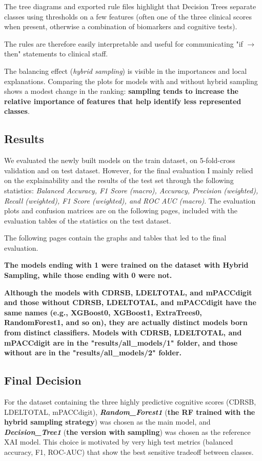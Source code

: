 The tree diagrams and exported rule files highlight that Decision Trees separate classes using thresholds on a few features (often one of the three clinical scores when present, otherwise a combination of biomarkers and cognitive tests). 

The rules are therefore easily interpretable and useful for communicating "if $\to$ then" statements to clinical staff.

\vspace{2mm}

The balancing effect (\textit{hybrid sampling}) is visible in the importances and local explanations.
Comparing the plots for models with and without hybrid sampling shows a modest change in the ranking: \textbf{sampling tends to increase the relative importance of features that help identify less represented classes}.

\subsection{Results}
We evaluated the newly built models on the train dataset, on 5-fold-cross validation and on test dataset. However, for the final evaluation I mainly relied on the explainability and the results of the test set through the following statistics: \textit{Balanced Accuracy, F1 Score (macro), Accuracy, Precision (weighted), Recall (weighted), F1 Score (weighted), and ROC AUC (macro)}. The evaluation plots and confusion matrices are on the following pages, included with the evaluation tables of the statistics on the test dataset. 

The following pages contain the graphs and tables that led to the final evaluation. 

\textbf{The models ending with 1 were trained on the dataset with Hybrid Sampling, while those ending with 0 were not.}

\textbf{Although the models with CDRSB, LDELTOTAL, and mPACCdigit and those without CDRSB, LDELTOTAL, and mPACCdigit have the same names (e.g., XGBoost0, XGBoost1, ExtraTrees0, RandomForest1, and so on), they are actually distinct models born from distinct classifiers. Models with CDRSB, LDELTOTAL, and mPACCdigit are in the "results/all\_models/1" folder, and those without are in the \linebreak "results/all\_models/2" folder.}

\subsection{Final Decision}
For the dataset containing the three highly predictive cognitive scores (CDRSB, LDELTOTAL, mPACCdigit), \textbf{\textit{Random\_Forest1}} (\textbf{the RF trained with the hybrid sampling strategy}) was chosen as the main model, and \textbf{\textit{Decision\_Tree1}} (\textbf{the version with sampling}) was chosen as the reference XAI model. This choice is motivated by very high test metrics (balanced accuracy, F1, ROC-AUC) that show the best sensitive tradeoff between classes.

